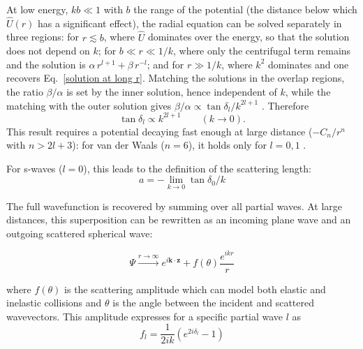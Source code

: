 At low energy, $kb\ll1$ with $b$ the range of the potential (the distance
below which $\hat U(r)$ has a significant effect), the radial equation can be
solved separately in three regions: for $r\lesssim b$, where $\hat U$ dominates
over the energy, so that the solution does not depend on $k$; for
$b\ll r\ll1/k$, where only the centrifugal term remains and the solution is
$\alpha\,r^{l+1}+\beta\,r^{-l}$; and for $r\gg1/k$, where $k^2$ dominates and
one recovers Eq.~\ref{solution at long r}. Matching the solutions in the
overlap regions, the ratio $\beta/\alpha$ is set by the inner solution, hence
independent of $k$, while the matching with the outer solution gives
$\beta/\alpha\propto\tan\delta_l/k^{2l+1}$ \cite{dalibard_interactions_nodate}.
Therefore
\begin{equation}
    \tan\delta_l \propto k^{2l+1} \qquad (k\to0).
\end{equation}
This result requires a potential decaying fast enough at large distance
($-C_n/r^n$ with $n>2l+3$): for van der Waals ($n=6$), it holds only for
$l=0,1$ \cite{dalibard_interactions_nodate}.

For s-waves ($l=0$), this leads to the definition of the scattering length:
\begin{equation}
    a = -\lim_{k\to 0} \tan\delta_0/k
    \label{scattering length}
\end{equation}

The full wavefunction is recovered by summing over all partial waves. At large distances, this
superposition can be rewritten as an incoming plane wave and an outgoing scattered spherical wave:

\begin{equation}
    \Psi \xrightarrow{r\to\infty} e^{i\mathbf{k}\cdot \mathbf{z}} + f(\theta) \frac{e^{ikr}}{r}
    \label{incoming outcoming scattering wave}
\end{equation}

where $f(\theta)$ is the scattering amplitude which can model both elastic and inelastic collisions and $\theta$ is the angle between the incident and scattered wavevectors. This amplitude expresses for a specific 
partial wave $l$ as
\begin{equation}
    f_l = \frac{1}{2 i k}(e^{2i\delta_l} -1)
\end{equation}

